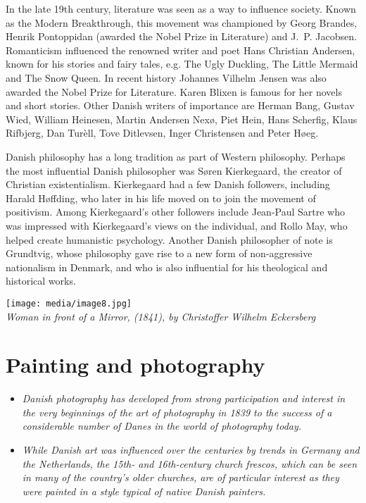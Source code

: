 In the late 19th century, literature was seen as a way to influence
society. Known as the Modern Breakthrough, this movement was championed
by Georg Brandes, Henrik Pontoppidan (awarded the Nobel Prize in
Literature) and J.~P. Jacobsen. Romanticism influenced the renowned
writer and poet Hans Christian Andersen, known for his stories and fairy
tales, e.g. The Ugly Duckling, The Little Mermaid and The Snow Queen. In
recent history Johannes Vilhelm Jensen was also awarded the Nobel Prize
for Literature. Karen Blixen is famous for her novels and short stories.
Other Danish writers of importance are Herman Bang, Gustav Wied, William
Heinesen, Martin Andersen Nexø, Piet Hein, Hans Scherfig, Klaus
Rifbjerg, Dan Turèll, Tove Ditlevsen, Inger Christensen and Peter Høeg.

Danish philosophy has a long tradition as part of Western philosophy.
Perhaps the most influential Danish philosopher was Søren Kierkegaard,
the creator of Christian existentialism. Kierkegaard had a few Danish
followers, including Harald Høffding, who later in his life moved on to
join the movement of positivism. Among Kierkegaard's other followers
include Jean-Paul Sartre who was impressed with Kierkegaard's views on
the individual, and Rollo May, who helped create humanistic psychology.
Another Danish philosopher of note is Grundtvig, whose philosophy gave
rise to a new form of non-aggressive nationalism in Denmark, and who is
also influential for his theological and historical works.

\texttt{[image: media/image8.jpg]}\\
\emph{Woman in front of a Mirror, (1841), by Christoffer Wilhelm
Eckersberg}

\section{Painting and photography}\label{painting-and-photography}

\begin{itemize}
\item
  \emph{Danish photography has developed from strong participation and
  interest in the very beginnings of the art of photography in 1839 to
  the success of a considerable number of Danes in the world of
  photography today.}
\item
  \emph{While Danish art was influenced over the centuries by trends in
  Germany and the Netherlands, the 15th- and 16th-century church
  frescos, which can be seen in many of the country's older churches,
  are of particular interest as they were painted in a style typical of
  native Danish painters.}
\end{itemize}

